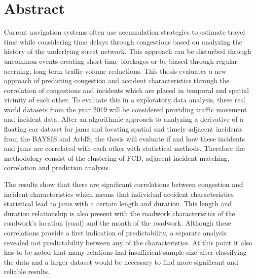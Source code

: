 \cleardoubleoddpage

\chapter*{Abstract}
\thispagestyle{empty} %
Current navigation systems often use accumulation strategies to estimate travel time while considering time delays through congestions based on analyzing the history of the underlying street network. This approach can be disturbed through uncommon events creating short time blockages or be biased through regular accruing, long-term traffic volume reductions. This thesis evaluates a new approach of predicting congestion and accident characteristics through the correlation of congestions and incidents which are placed in temporal and spatial vicinity of each other. To evaluate this in a exploratory data analysis, three real world datasets from the year 2019 will be considered providing traffic movement and incident data. After an algorithmic approach to analyzing a derivative of a floating car dataset for jams and locating spatial and timely adjacent incidents from the BAYSIS and ArbIS, the thesis will evaluate if and how these incidents and jams are correlated with each other with statistical methods. Therefore the methodology consist of the clustering of FCD, adjacent incident matching, correlation and prediction analysis.

The results show that there are significant correlations between congestion and incident characteristics which means that individual accident characteristics statistical lead to jams with a certain length and duration. This length and duration relationship is also present with the roadwork characteristics of the roadwork's location (road) and the month of the roadwork. Although these correlations provide a first indication of predictability, a separate analysis revealed not predictability between any of the characteristics. At this point it also has to be noted that many relations had insufficient sample size after classifying the data and a larger dataset would be necessary to find more significant and reliable results.

